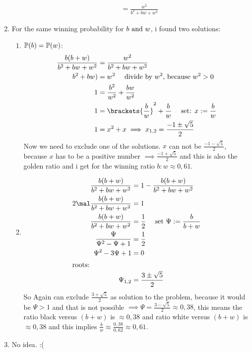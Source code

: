 \begin{solution}
\begin{enumerate}[label=\alph*)]
\begin{enumerate}[label=\arabic*)]
\begin{align*}
				&= \frac{w^2}{b^2 + bw + w^2}
			\end{align*}
		\end{enumerate}
		\item For the same winning probability for $b \text{ and } w$, i found two solutions:
		\begin{enumerate}[label=\arabic*)]
			\item $\mathbb{P}(b) = \mathbb{P}(w)$:
			\begin{align*}
				\frac{b(b+w)}{b^2+bw+w^2} &= \frac{w^2}{b^2 + bw + w^2}\\
				b^2+bw) &= w^2 \quad \text{ divide by $w^2$, because $w^2 >0$}\\
				1 &= \frac{b^2}{w^2} + \frac{bw}{w^2}\\
				1 &= \brackets{\frac{b}{w}}^2 + \frac{b}{w} \quad \text{ set: } x:= \frac{b}{w}\\
				1 &= x^2 + x \implies x_{1,2} = \frac{-1 \pm \sqrt{5}}{2}
			\end{align*}
			Now we need to exclude one of the solutions. $x$ can not be $\frac{-1 - \sqrt{5}}{2}$, because $x$ has to be a positive number $\implies \frac{-1 + \sqrt{5}}{2}$ and this is also the golden ratio and i get for the winning ratio $b:w \approx 0,61$.
			\item 
			\begin{align*}
				\frac{b(b+w)}{b^2 + bw + w^2} 
				&= 1 - \frac{b(b+w)}{b^2 + bw + w^2}\\
				2 \mal \frac{b(b+w)}{b^2 + bw + w^2} 
				&= 1\\
				\frac{b(b+w)}{b^2 + bw + w^2} 
				&= \frac{1}{2} \quad \text{ set } \Psi := \frac{b}{b+w}\\
				\frac{\Psi}{\Psi^2 - \Psi + 1} 
				&= \frac{1}{2}\\
				\Psi^2 - 3\Psi + 1 
				&= 0\\
				\intertext{roots:}
				\Psi_{1,2} 
				&= \frac{3 \pm \sqrt{5}}{2}
			\end{align*}
				So Again can exclude $\frac{3 + \sqrt{5}}{2}$ as solution to the problem, because it would be $\Psi > 1$ and that is not possible $\implies \Psi = \frac{3 - \sqrt{5}}{2} \approx 0,38$, this means the ratio black versus $(b+w)$ is $\approx 0,38$ and ratio white versus $(b+w)$ is $\approx 0,38$ and this implies $\frac{b}{w} \approx \frac{0,38}{0,62} \approx 0,61$. 
			\end{enumerate}
			\item No idea. :( 
		\end{enumerate}
	\end{solution}

